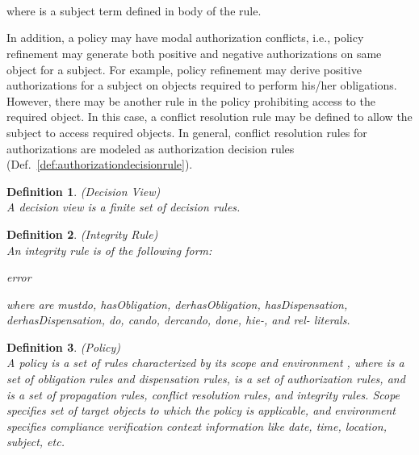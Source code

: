 \documentclass[12pt,journal,letterpaper,onecolumn]{IEEEtran}
\newtheorem{definition}{Definition}[section]
\begin{document}
 \\
 \\
\\
where  is a subject term defined in body of the rule.

In addition, a policy may have modal authorization conflicts, i.e.,
policy refinement may generate both positive and negative
authorizations on same object for a subject. For example, policy
refinement may derive positive authorizations for a subject on
objects required to perform his/her obligations. However, there may
be another rule in the policy prohibiting access to the required
object. In this case, a conflict resolution rule may be defined to
allow the subject to access required objects. In general, conflict
resolution rules for authorizations are modeled as authorization
decision rules (Def.~\ref{def:authorizationdecisionrule}).


\begin{definition}(Decision View)\\
A decision view is a finite set of decision rules.
\end{definition}


\begin{definition}(Integrity Rule)\\
An integrity rule is of the following form:
\begin{center}
{\ttfamily error  }
\end{center}
where  are mustdo, hasObligation, derhasObligation,
hasDispensation, derhasDispensation, do, cando, dercando, done,
hie-, and rel- literals.
\end{definition}

\begin{definition}(Policy) \\
\noindent A {\em policy}  is a set of rules  characterized by its scope  and environment ,
where  is a set of obligation rules and dispensation rules, 
is a set of authorization rules, and  is a set of propagation
rules, conflict resolution rules, and integrity rules. Scope
specifies set of target objects to which the policy is applicable,
and environment specifies compliance verification context
information like date, time, location, subject, etc.
\label{def:policy}
\end{definition}
\end{document}
